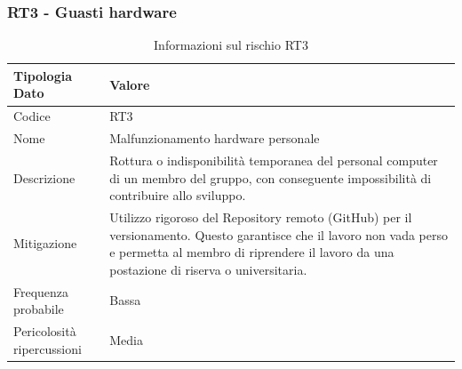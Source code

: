 \documentclass[a4paper,12pt]{article}
\begin{document}
\subsubsection{RT3 - Guasti hardware}
\begin{table}[H]
    \centering
    \renewcommand{\arraystretch}{1.4}
    \begin{tabularx}{\textwidth}{|L|Z|}
        \hline
        \textbf{Tipologia Dato} & \textbf{Valore} \\
        \hline
        Codice & RT3 \\
        \hline
        Nome & Malfunzionamento hardware personale \\
        \hline
        Descrizione & Rottura o indisponibilità temporanea del personal computer di un membro del gruppo, con conseguente impossibilità di contribuire allo sviluppo. \\
        \hline
        Mitigazione & Utilizzo rigoroso del Repository remoto (GitHub) per il versionamento. Questo garantisce che il lavoro non vada perso e permetta al membro di riprendere il lavoro da una postazione di riserva o universitaria. \\
        \hline
        Frequenza probabile & Bassa \\
        \hline
        Pericolosità ripercussioni & Media \\
        \hline
    \end{tabularx}
    \caption{Informazioni sul rischio RT3}
    \label{tab:RT3}
\end{table}
\end{document}
